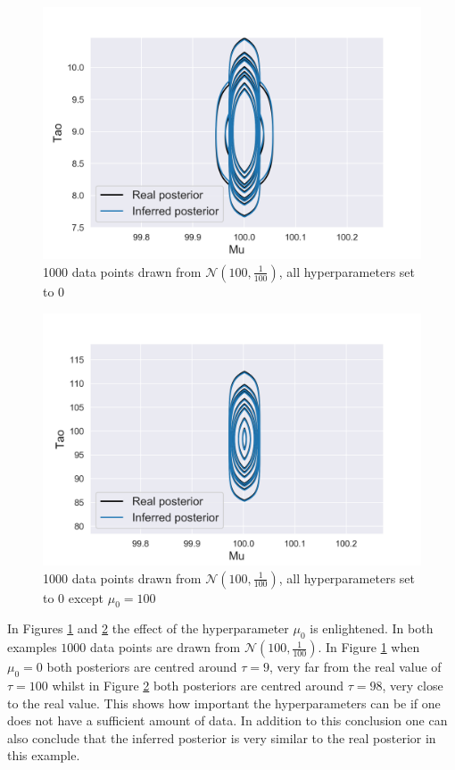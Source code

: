 \begin{figure}[H]
  \centering
  \includegraphics[width=\linewidth]{VI_plot_N_1000-mu_100-tau_100.png}
  \caption{1000 data points drawn from $\mathcal{N}(100,\frac{1}{100})$, all hyperparameters set to $0$}
  \label{VI_3}
\end{figure}

\begin{figure}[H]
  \centering
  \includegraphics[width=\linewidth]{VI_plot_N_1000-mu_100-tau_100-mu0_100.png}
  \caption{1000 data points drawn from $\mathcal{N}(100,\frac{1}{100})$, all hyperparameters set to $0$ except $\mu_0 = 100$ }
  \label{VI_4}
\end{figure}

In Figures \ref{VI_3} and \ref{VI_4} the effect of the hyperparameter $\mu_0$ is enlightened. In both examples $1000$ data points are drawn from $\mathcal{N}(100,\frac{1}{100})$. In Figure \ref{VI_3} when $\mu_0 = 0$ both posteriors are centred around $\tau = 9$, very far from the real value of $\tau = 100$ whilst in Figure \ref{VI_4} both posteriors are centred around $\tau = 98$, very close to the real value. This shows how important the hyperparameters can be if one does not have a sufficient amount of data. In addition to this conclusion one can also conclude that the inferred posterior is very similar to the real posterior in this example.
